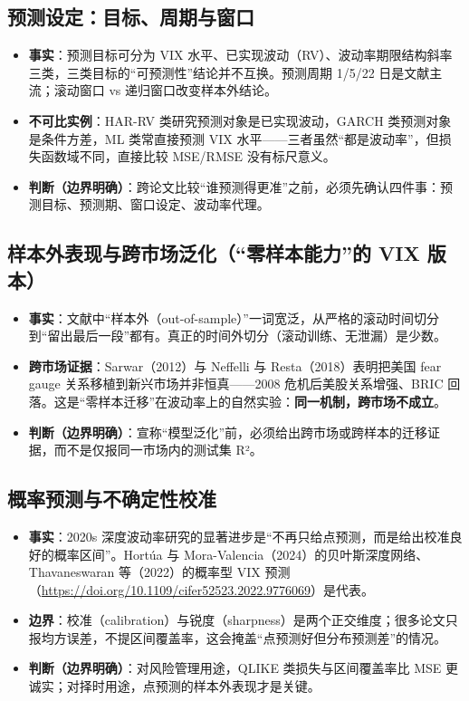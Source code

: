 \documentclass[11pt,a4paper]{article}
\begin{document}
\subsection{预测设定：目标、周期与窗口}

\begin{itemize}[leftmargin=2.2em]
  \item \textbf{事实}：预测目标可分为 VIX 水平、已实现波动（RV）、波动率期限结构斜率三类，三类目标的“可预测性”结论并不互换。预测周期 1/5/22 日是文献主流；滚动窗口 vs 递归窗口改变样本外结论。
  \item \textbf{不可比实例}：HAR-RV 类研究预测对象是已实现波动，GARCH 类预测对象是条件方差，ML 类常直接预测 VIX 水平——三者虽然“都是波动率”，但损失函数域不同，直接比较 MSE/RMSE 没有标尺意义。
  \item \textbf{判断（边界明确）}：跨论文比较“谁预测得更准”之前，必须先确认四件事：预测目标、预测期、窗口设定、波动率代理。
\end{itemize}

\subsection{样本外表现与跨市场泛化（“零样本能力”的 VIX 版本）}

\begin{itemize}[leftmargin=2.2em]
  \item \textbf{事实}：文献中“样本外（out-of-sample）”一词宽泛，从严格的滚动时间切分到“留出最后一段”都有。真正的时间外切分（滚动训练、无泄漏）是少数。
  \item \textbf{跨市场证据}：Sarwar（2012）与 Neffelli 与 Resta（2018）表明把美国 fear gauge 关系移植到新兴市场并非恒真——2008 危机后美股关系增强、BRIC 回落。这是“零样本迁移”在波动率上的自然实验：\textbf{同一机制，跨市场不成立}。
  \item \textbf{判断（边界明确）}：宣称“模型泛化”前，必须给出跨市场或跨样本的迁移证据，而不是仅报同一市场内的测试集 R²。
\end{itemize}

\subsection{概率预测与不确定性校准}

\begin{itemize}[leftmargin=2.2em]
  \item \textbf{事实}：2020s 深度波动率研究的显著进步是“不再只给点预测，而是给出校准良好的概率区间”。Hortúa 与 Mora-Valencia（2024）的贝叶斯深度网络、Thavaneswaran 等（2022）的概率型 VIX 预测（\url{https://doi.org/10.1109/cifer52523.2022.9776069}）是代表。
  \item \textbf{边界}：校准（calibration）与锐度（sharpness）是两个正交维度；很多论文只报均方误差，不提区间覆盖率，这会掩盖“点预测好但分布预测差”的情况。
  \item \textbf{判断（边界明确）}：对风险管理用途，QLIKE 类损失与区间覆盖率比 MSE 更诚实；对择时用途，点预测的样本外表现才是关键。
\end{itemize}
\end{document}
